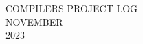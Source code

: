 \documentclass[10pt]{article} %
\begin{document}





\begin{center}

 \textsc{\LARGE COMPILERS PROJECT LOG}\\
	
 \textsc{\Large NOVEMBER}\\ %
	
 \textsc{\large 2023} %
\end{center}


\end{document}
